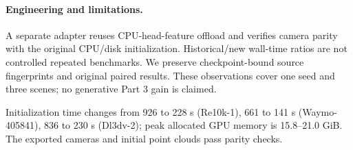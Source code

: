 \paragraph{Engineering and limitations.} A separate adapter reuses CPU-head-feature offload and verifies camera parity with the original CPU/disk initialization. Historical/new wall-time ratios are not controlled repeated benchmarks. We preserve checkpoint-bound source fingerprints and original paired results. These observations cover one seed and three scenes; no generative Part 3 gain is claimed.

Initialization time changes from 926 to 228 s (Re10k-1), 661 to 141 s (Waymo-405841), 836 to 230 s (Dl3dv-2); peak allocated GPU memory is 15.8--21.0 GiB. The exported cameras and initial point clouds pass parity checks.
